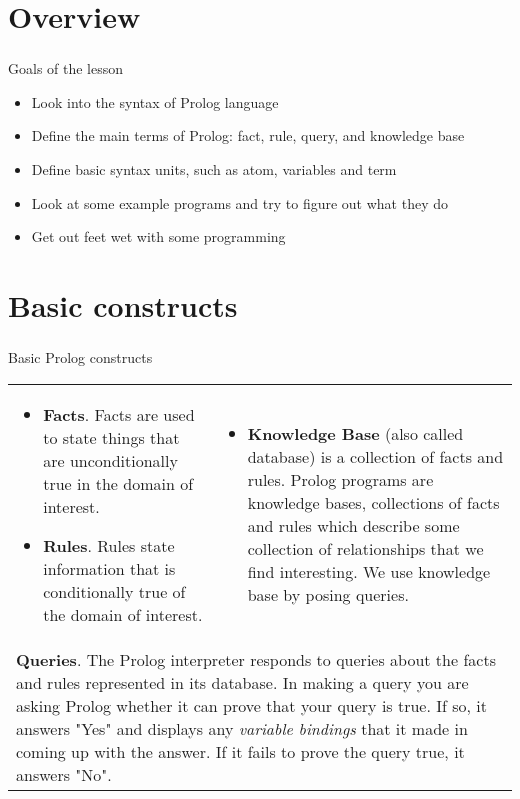 \section{Overview}

\begin{frame}
	\frametitle{\insertsection}
	Goals of the lesson
	\begin{itemize}
		\item Look into the syntax of Prolog language
		\item Define the main terms of Prolog: fact, rule, query, and knowledge base
		\item Define basic syntax units, such as atom, variables and term
		\item Look at some example programs and try to figure out what they do
		\item Get out feet wet with some programming
	\end{itemize}
\end{frame}


\section{Basic constructs}

\begin{frame}
	\frametitle{\insertsection}
	
	Basic Prolog constructs
	\begin{tabular}{p{}p{}}
		\begin{itemize}
			\item \textbf{Facts}. Facts are used to state things that are unconditionally true in the domain of interest.
			\item \textbf{Rules}. Rules state information that is conditionally true of the domain of interest.
		\end{itemize}
		&
		\begin{itemize}
			\item[] \textbf{Knowledge Base} (also called database) is a collection of facts and rules. Prolog programs are knowledge
			bases, collections of facts and rules which describe some collection of relationships that we find interesting. We use knowledge base
			by posing queries.
		\end{itemize} \\
		\multicolumn{2}{p{\textwidth}}{
				\textbf{Queries}. The Prolog interpreter responds to queries about the facts and rules represented in its database. In making a query you are asking Prolog whether it can prove that your query is true. If so, it answers "Yes" and displays any \textit{variable bindings} that it made in coming up with the answer. If it fails to prove the query true, it answers "No".
		}
	\end{tabular}
	

\end{frame}

